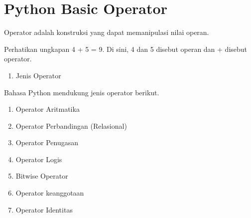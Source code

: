 \sloppy
\section{Python Basic Operator}


\vspace{12pt}
\noindent 
Operator adalah konstruksi yang dapat memanipulasi nilai operan. \par
\vspace{12pt}
\noindent 
Perhatikan ungkapan 4 + 5 = 9. Di sini, 4 dan 5 disebut operan dan + disebut operator. \par
\vspace{12pt}
\noindent 
\begin{enumerate}
\item Jenis Operator 
\end{enumerate}

\vspace{12pt}
\noindent 
Bahasa Python mendukung jenis operator berikut. \par
\vspace{12pt}
\noindent 
\begin{enumerate}
	\item Operator Aritmatika 
	\item Operator Perbandingan (Relasional) 
	\item Operator Penugasan \par
	\item Operator Logis \par
	\item Bitwise Operator \par
	\item Operator keanggotaan \par
	\item Operator Identitas \par
\end{enumerate}



